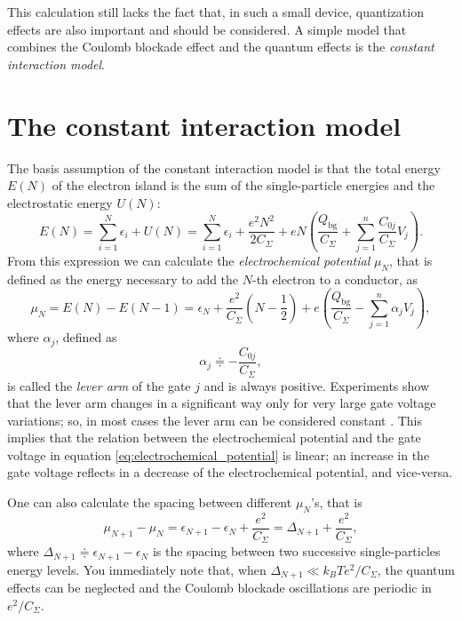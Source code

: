 \documentclass[a4paper,twoside,11pt]{book}
\begin{document}
This calculation still lacks the fact that, in such a small device, quantization effects are also important and should be considered. A simple model that combines the Coulomb blockade effect and the quantum effects is the \emph{constant interaction model}.

\section{The constant interaction model}
The basis assumption of the constant interaction model is that the total energy $E(N)$ of the electron island is the sum of the single-particle energies and the electrostatic energy $U(N)$:
\begin{equation}
	E(N) = \sum_{i=1}^{N}\epsilon_i + U(N) = \sum_{i=1}^{N}\epsilon_i + \frac{e^2N^2}{2C_{\Sigma}} + eN\left( \frac{Q_{\text{bg}}}{C_{\Sigma}} + \sum_{j=1}^{n}\frac{C_{0j}}{C_{\Sigma}}V_j \right).
\end{equation}
From this expression we can calculate the \emph{electrochemical potential} $\mu_N$, that is defined as the energy necessary to add the $N$-th electron to a conductor, as
\begin{equation}
	\mu_N 
	= E(N) - E(N-1) 
	=  \epsilon_N + \frac{e^2}{C_{\Sigma}}\left(N-\frac{1}{2}\right) + e\left( \frac{Q_{\text{bg}}}{C_{\Sigma}} - \sum_{j=1}^{n}\alpha_jV_j \right),
	\label{eq:electrochemical_potential}
\end{equation}
where $\alpha_j$, defined as
\begin{equation}
	\alpha_j \doteqdot - \frac{C_{0j}}{C_{\Sigma}},
\end{equation}
is called the \emph{lever arm} of the gate $j$ and is always positive. Experiments show that the lever arm changes in a significant way only for very large gate voltage variations; so, in most cases the lever arm can be considered constant \citep{Fasth2007}. This implies that the relation between the electrochemical potential and the gate voltage in equation \eqref{eq:electrochemical_potential} is linear; an increase in the gate voltage reflects in a decrease of the electrochemical potential, and vice-versa.

One can also calculate the spacing between different $\mu_N$'s, that is
\begin{equation}
	\mu_{N+1}-\mu_N 
	= \epsilon_{N+1} - \epsilon_{N} + \frac{e^2}{C_{\Sigma}}
	= \Delta_{N+1} + \frac{e^2}{C_{\Sigma}},
\end{equation}
where $\Delta_{N+1}\doteqdot \epsilon_{N+1} - \epsilon_{N}$ is the spacing between two successive single-particles energy levels. You immediately note that, when $\Delta_{N+1} \ll k_BT e^2/C_{\Sigma}$, the quantum effects can be neglected and the Coulomb blockade oscillations are periodic in $e^2/C_{\Sigma}$.
\end{document}
